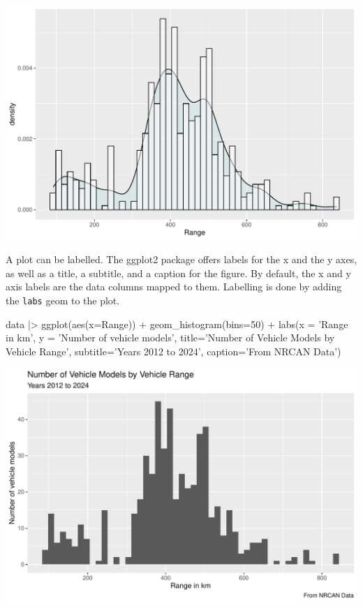 \begin{center}
  \includegraphics[width=.8\textwidth]{fuel.histogram.pdf}
\end{center}

A plot can be labelled. The ggplot2 package offers labels for the x and the y axes, as well as a title, a subtitle, and a caption for the figure. By default, the x and y axis labels are the data columns mapped to them. Labelling is done by adding the \texttt{labs} geom to the plot.

\begin{samepage}
\begin{Rcode}
data |>  ggplot(aes(x=Range)) + 
    geom_histogram(bins=50) +
    labs(x = 'Range in km',
         y = 'Number of vehicle models',
         title='Number of Vehicle Models by Vehicle Range',
         subtitle='Years 2012 to 2024',
         caption='From NRCAN Data')
\end{Rcode}
\end{samepage}

\begin{center}
  \includegraphics[width=.8\textwidth]{fuel.histogram.labels.pdf}
\end{center}



